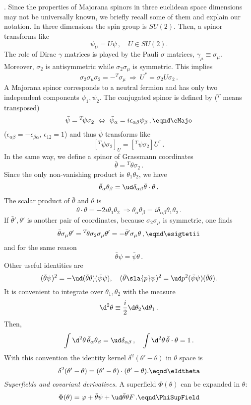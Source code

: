 \medskip
{}. Since the properties of Majorana
spinors in three euclidean space dimensions may not be universally
known, we briefly recall some of them and explain our notation. In
three dimensions the spin group is $SU(2)$. Then, a spinor
transforms like
$$\psi_U=U\psi\,, \quad U\in SU(2).$$
The role of Dirac $\gamma$ matrices is played by the Pauli $\sigma$ matrices,
$\gamma_\mu\equiv \sigma_\mu$. Moreover, $\sigma_2$ is antisymmetric while
$\sigma_2\sigma_\mu$ is symmetric. This implies
$$\sigma_2\sigma_\mu\sigma_2=-{}^T\!\sigma_\mu \ \Rightarrow\ U^*=\sigma_2 U
\sigma_2\, .$$ A Majorana spinor corresponds to a neutral
fermion and has only two independent components $\psi_1,\psi_2$.
The conjugated spinor is defined by (${}^T$ means transposed)
$$\bar\psi={}^T\!\psi \sigma_2 \ \Leftrightarrow  \ \bar\psi  _\alpha =i  \epsilon  _{\alpha \beta }\psi _\beta\,,\eqnd\eMajo $$
($\epsilon _{\alpha \beta }=-\epsilon _{\beta \alpha }$, $\epsilon _{12}=1$) and thus $\bar\psi$ transforms like
$$[{}^T\!\psi \sigma_2]_U=[{}^T\!\psi \sigma_2] U^\dagger\,  .$$
In the same way, we define a spinor of Grassmann coordinates
$$\bar\theta={}^T\!\theta \sigma_2 \,.$$
Since the only non-vanishing product is $\theta_1\theta_2$, we have
$$\bar\theta_\alpha\theta_\beta=\ud\delta_{\alpha\beta}
\bar\theta\cdot\theta\,.$$
The scalar product of $\bar\theta$ and $\theta$ is
$$\bar\theta\cdot\theta=-2i\theta_1\theta_2\ \Rightarrow
\theta_\alpha\bar\theta_\beta=i\delta_{\alpha\beta}\theta_1\theta_2
\,.$$
 If $\bar \theta',\theta'$ is another pair of coordinates,
because $\sigma_2\sigma_\mu$ is symmetric,  one finds
$$\bar\theta \sigma_\mu \theta'={}^T\!\theta\sigma_2\sigma_\mu\theta'=
-\bar\theta' \sigma_\mu \theta\,, \eqnd\esigtetii $$
and for the same reason
$$\bar \theta\psi=\bar\psi\theta\,.$$
Other useful identities are
$$(\bar\theta\psi)^2=-\ud (\bar\theta\theta)(\bar\psi\psi),\quad
(\bar\theta\sla{p}\psi)^2=\ud p^2(\bar\psi\psi)(\bar\theta\theta). $$
It is convenient to integrate over $\theta_1,\theta_2$ with the measure
$$\d^2\theta\equiv {i\over2}\d\theta_2\d\theta_1\, .$$
Then,
$$\int\d^2\theta\,\bar\theta_\alpha\theta_\beta=\ud
\delta_{\alpha\beta}\,,\quad
\int\d^2\theta\,\bar\theta\cdot\theta=1\,.$$
With this convention the identity kernel $\delta^2(\theta'-\theta)$ in
$\theta$ space is
$$\delta^2(\theta'-\theta)=(\bar\theta'-\bar\theta)\cdot
(\theta'-\theta).
\eqnd\eIdtheta $$
\medskip
{\it Superfields and covariant derivatives.}
A superfield $\Phi(\theta)$ can be expanded in $\theta $:
$$\Phi(\theta)=\varphi+\bar\theta\psi+\ud\bar\theta
\theta F \,.\eqnd\PhiSupField$$
